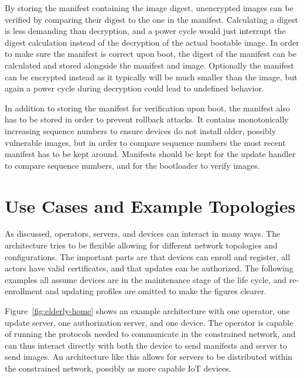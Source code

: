 \documentclass[0-thesis.tex]{subfiles}
\begin{document}
By storing the manifest containing the image digest, unencrypted images can be verified by
comparing their digest to the one in the manifest. Calculating a digest is less demanding
than decryption, and a power cycle would just interrupt the digest calculation instead of
the decryption of the actual bootable image. In order to make sure the manifest is correct
upon boot, the digest of the manifest can be calculated and stored alongside the manifest
and image. Optionally the manifest can be encrypted instead as it typically will be much
smaller than the image, but again a power cycle during decryption could lead to undefined
behavior.

In addition to storing the manifest for verification upon boot, the manifest also has to
be stored in order to prevent rollback attacks. It contains monotonically increasing
sequence numbers to ensure devices do not install older, possibly vulnerable images, but
in order to compare sequence numbers the most recent manifest has to be kept around.
Manifests should be kept for the update handler to compare sequence numbers, and for the
bootloader to verify images.

\section{Use Cases and Example Topologies}
\label{ssec:use-cases-examples-topologies}
As discussed, operators, servers, and devices can interact in many ways. The architecture
tries to be flexible allowing for different network topologies and configurations. The
important parts are that devices can enroll and register, all actors have valid
certificates, and that updates can be authorized. The following examples all assume
devices are in the maintenance stage of the life cycle, and re-enrollment and updating
profiles are omitted to make the figures clearer.

Figure~\ref{fig:elderly-home} shows an example architecture with one operator, one
update server, one authorization server, and one device. The operator is capable of
running the protocols needed to communicate in the constrained network, and can thus
interact directly with both the device to send manifests and server to send images. An
architecture like this allows for servers to be distributed within the constrained
network, possibly as more capable IoT devices.
\end{document}
